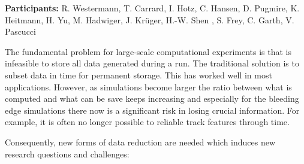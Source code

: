 \license

\textbf{\sffamily Participants:} R. Westermann, T. Carrard, I. Hotz, C. Hansen, D. Pugmire, K. Heitmann, H. Yu, M. Hadwiger, J. Krüger, H.-W. Shen , S. Frey, C. Garth, V. Pascucci

The fundamental problem for large-scale computational experiments is that is infeasible to store all data generated during a run. The traditional solution is to subset data in time for permanent storage. This has worked well in most applications. However, as simulations become larger the ratio between what is computed and what can be save keeps increasing and especially for the bleeding edge simulations there now is a significant risk in losing crucial information. For example, it is often no longer possible to reliable track features \cite{DBLP:conf/ldav/Widanagamaachchi15} through time. 

Consequently, new forms of data reduction are needed which induces new research questions and challenges:

